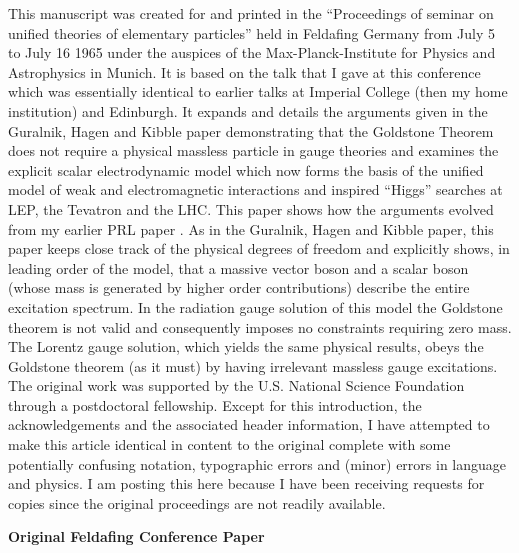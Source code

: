 \documentclass[%
  12pt,
  paper=letter,
  abstracton,
  pagesize=auto,
  version=last,
  DIV=calc
  ]{scrartcl}
\def\textsf{}
\begin{document}
This manuscript was created for and printed in the ``Proceedings of
seminar on unified theories of elementary particles'' held in Feldafing
Germany from July 5 to July 16 1965 under the auspices of the
Max-Planck-Institute for Physics and Astrophysics in Munich. It is
based on the talk that I gave at this conference which was essentially
identical to earlier talks at Imperial College (then my home
institution) and Edinburgh. It expands and details the arguments given
in the Guralnik, Hagen and Kibble paper \cite{13} demonstrating that
the Goldstone Theorem does not require a physical massless particle in
gauge theories  and examines the explicit scalar electrodynamic model
which now forms the basis of the unified model of weak and
electromagnetic interactions and inspired ``Higgs'' searches at LEP, the
Tevatron and the LHC. This paper shows how the arguments evolved from
my earlier PRL paper \cite{10}. As in the Guralnik, Hagen and Kibble
paper, this paper keeps close track of the physical degrees of freedom
and explicitly shows, in leading order of the model, that a massive
vector boson and a scalar boson (whose mass is generated by higher
order contributions) describe the entire excitation spectrum. In the
radiation gauge solution of this model the  Goldstone theorem is not
valid and consequently imposes no constraints requiring zero mass. The
Lorentz gauge solution, which yields the same physical results, obeys
the Goldstone theorem (as it must) by having irrelevant massless gauge
excitations. The original work was supported by the U.S. National
Science Foundation through a postdoctoral fellowship. Except for this
introduction, the acknowledgements and the associated header information, I have attempted to
make this article identical in content to the original complete with
some potentially confusing notation, typographic errors and (minor) errors in language and physics. I am posting this here because I have been receiving requests for copies since the original proceedings are
not readily available.
\bigskip\bigskip

\vspace{0.5in}
\begin{center}
  \textbf{\textsf{Original Feldafing Conference Paper}}
\end{center}
\end{document}
